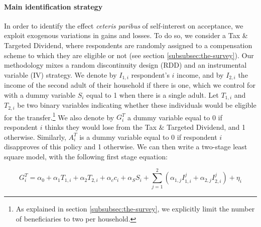 \documentclass[12pt]{article} %
\begin{document}
\paragraph{Main identification strategy}

In order to identify the effect \textit{ceteris paribus} of self-interest on acceptance, we exploit exogenous variations in gains and losses. To do so, we consider a Tax \& Targeted Dividend, where respondents are randomly assigned to a compensation scheme to which they are eligible or not (see section \ref{subsubsec:the-survey}). Our methodology mixes a random discontinuity design (RDD) and an instrumental variable (IV) strategy. We denote by $I_{1,i}$ respondent's $i$ income, and by $I_{2,i}$ the income of the second adult of their household if there is one, which we control for with a dummy variable $S_i$ equal to 1 when there is a single adult. Let $T_{1,i}$ and $T_{2,i}$ be two binary variables indicating whether these individuals would be eligible for the transfer.\footnote{As explained in section \ref{subsubsec:the-survey}, we explicitly limit the number of beneficiaries to two per household.} We also denote by $G_i^T$ a dummy variable equal to 0 if respondent $i$ thinks they would lose from the Tax \& Targeted Dividend, and 1 otherwise. Similarly, $A_i^T$ is a dummy variable equal to 0 if respondent $i$ disapproves of this policy and 1 otherwise. We can then write a two-stage least square model, with the following first stage equation:



\begin{equation}
    G_i^T = \alpha_0 + \alpha_1 T_{1,i} + \alpha_2 T_{2,i} + \alpha_c c_i  + \alpha_S S_i + \sum_{j=1}^2 \left( \alpha_{1,j} I_{1,i}^j + \alpha_{2,j} I_{2,i}^j \right) + \eta_i
    \label{eq:first_stage_parametric_rdd_approve_winner}
\end{equation}
\end{document}
